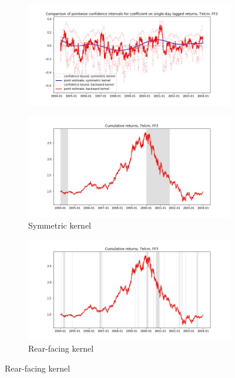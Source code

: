 \documentclass{article}
\begin{document}
\newpage

\begin{figure}

\centering

  \begin{subfigure}[b]{\textwidth}
    \includegraphics[width=\textwidth]{Telcm/pointwiseCIs_layered_FF3.jpg}
    \label{fig:1}
  \end{subfigure}
  \begin{subfigure}[b]{0.45\textwidth}
    \includegraphics[width=\textwidth]{Telcm/full_cumrets_ofint_FF3.jpg}
    \caption*{Symmetric kernel}
    \label{fig:2}
  \end{subfigure}
   \begin{subfigure}[b]{0.45\textwidth}
    \includegraphics[width=\textwidth]{Telcm/bwunif_full_cumrets_ofint_FF3.jpg}
    \caption*{Rear-facing kernel}
    \label{fig:2}
  \end{subfigure}
  
\end{figure}
\end{document}
